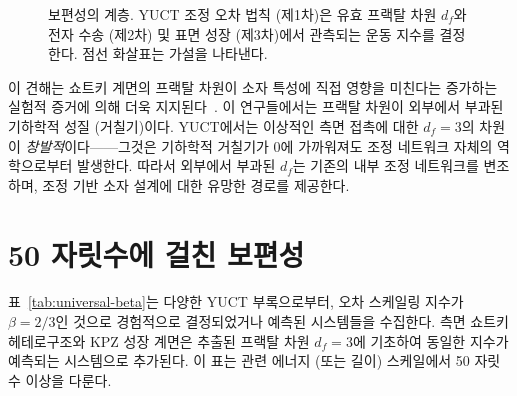 \documentclass[12pt,a4paper]{article}
\theoremstyle{remark}
\begin{document}
	\begin{figure}[htbp]
		\centering
		\caption{보편성의 계층. YUCT 조정 오차 법칙 (제1차)은 유효 프랙탈 차원 $d_f$와
			전자 수송 (제2차) 및 표면 성장 (제3차)에서 관측되는 운동 지수를 결정한다.
			점선 화살표는 가설을 나타낸다.}
		\label{fig:hierarchy}
	\end{figure}
	
	이 견해는 쇼트키 계면의 프랙탈 차원이 소자 특성에 직접 영향을 미친다는
	증가하는 실험적 증거에 의해 더욱 지지된다~\cite{FractalSchottky}. 이 연구들에서는
	프랙탈 차원이 외부에서 부과된 기하학적 성질 (거칠기)이다. YUCT에서는 이상적인
	측면 접촉에 대한 $d_f = 3$의 차원이 \emph{창발적}이다——그것은 기하학적 거칠기가
	0에 가까워져도 조정 네트워크 자체의 역학으로부터 발생한다. 따라서 외부에서
	부과된 $d_f$는 기존의 내부 조정 네트워크를 변조하며, 조정 기반 소자 설계에
	대한 유망한 경로를 제공한다.
	
	\section{50 자릿수에 걸친 보편성}
	표~\ref{tab:universal-beta}는 다양한 YUCT 부록으로부터, 오차 스케일링 지수가
	$\beta = 2/3$인 것으로 경험적으로 결정되었거나 예측된 시스템들을 수집한다.
	측면 쇼트키 헤테로구조와 KPZ 성장 계면은 추출된 프랙탈 차원 $d_f = 3$에
	기초하여 동일한 지수가 예측되는 시스템으로 추가된다.
	이 표는 관련 에너지 (또는 길이) 스케일에서 50 자릿수 이상을 다룬다.
	
\end{document}
